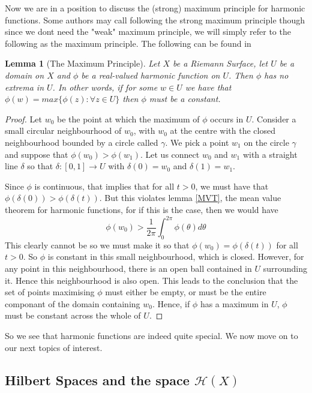\documentclass[a4paper,12pt]{report}
\theoremstyle{plain}
\newtheorem{lemma}[thm]{Lemma}
\theoremstyle{definition}
\begin{document}
Now we are in a position to discuss the (strong) maximum principle for harmonic functions. Some authors may call following the strong maximum principle though since we dont need the "weak" maximum principle, we will simply refer to the following as the maximum principle.
The following can be found in \cite{arnold}
\begin{lemma}[The Maximum Principle]\label{MaximumPrincipleDef}
  Let $X$ be a Riemann Surface, let $U$ be a domain on $X$ and $\phi$ be a real-valued harmonic function on $U$. Then $\phi$ has no extrema in $U$. In other words, if for some $w \in U$ we have that $\phi(w) = max\{\phi(z) \colon \forall z \in U\}$ then $\phi$ must be a constant.
\end{lemma}
\begin{proof}
  Let $w_0$ be the point at which the maximum of $\phi$ occurs in $U$. Consider a small circular neighbourhood of $w_0$, with $w_0$ at the centre with the closed neighbourhood bounded by a circle called $\gamma$. We pick a point $w_1$ on the circle $\gamma$ and suppose that $\phi(w_0)>\phi(w_1)$. Let us connect $w_0$ and $w_1$ with a straight line $\delta$ so that $\delta:[0,1] \rightarrow U$ with $\delta(0)=w_0$ and $\delta(1)=w_1$.
  
  Since $\phi$ is continuous, that implies that for all $t > 0$, we must have that $\phi(\delta(0)) > \phi(\delta(t))$. But this violates lemma \ref{MVT}, the mean value theorem for harmonic functions, for if this is the case, then we would have 
  \[ \phi(w_0) > \frac{1}{2\pi}\int_0^{2\pi}\phi(\theta)d\theta \]
  This clearly cannot be so we must make it so that $\phi(w_0) = \phi(\delta(t))$ for all $t > 0$. So $\phi$ is constant in this small neighbourhood, which is closed. However, for any point in this neighbourhood, there is an open ball contained in $U$ surrounding it. Hence this neighbourhood is also open. This leads to the conclusion that the set of points maximising $\phi$ must either be empty, or must be the entire componant of the domain containing $w_0$. Hence, if $\phi$ has a maximum in $U$, $\phi$ must be constant across the whole of $U$.
\end{proof}

So we see that harmonic functions are indeed quite special. We now move on to our next topics of interest.

\subsection{Hilbert Spaces and the space $\mathcal{H}(X)$}
\end{document}
